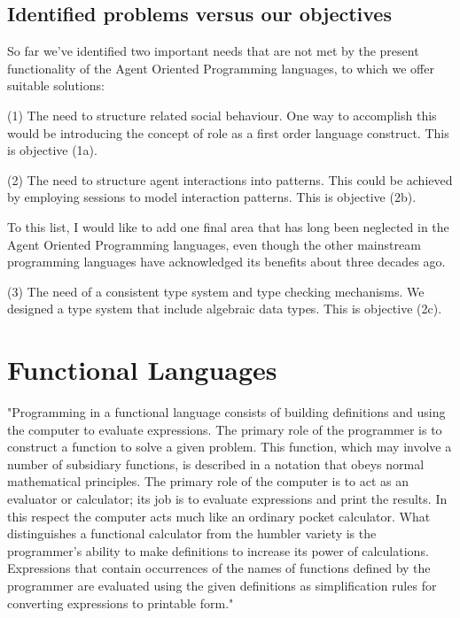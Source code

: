 \documentclass[a4paper,12pt,oneside,fleqn]{book} %
\begin{document}
\section{Identified problems versus our objectives} %
So far we've identified two important needs that are not met by the
present functionality of the Agent Oriented Programming languages, to which
we offer suitable solutions:

(1) The need to structure related social behaviour. One way to accomplish
this would be introducing the concept of role as a first order language
construct. This is objective (1a).

(2) The need to structure agent interactions into patterns. This could be
achieved by employing sessions to model interaction patterns. This is
objective (2b).

To this list, I would like to add one final area that has long been
neglected in the Agent Oriented Programming languages, even though the
other mainstream programming languages have acknowledged its benefits about
three decades ago.

(3) The need of a consistent type system and type checking mechanisms. We
designed a type system that include algebraic data types. This is objective
(2c).


\chapter{Functional Languages}\label{ch:flang} %

"Programming in a functional language consists of building definitions and
using the computer to evaluate expressions. The primary role of the
programmer is to construct a function to solve a given problem. This
function, which may involve a number of subsidiary functions, is described
in a notation that obeys normal mathematical principles. The primary role
of the computer is to act as an evaluator or calculator; its job is to
evaluate expressions and print the results. In this respect the computer
acts much like an ordinary pocket calculator. What distinguishes a
functional calculator from the humbler variety is the programmer's ability
to make definitions to increase its power of calculations. Expressions that
contain occurrences of the names of functions defined by the programmer are
evaluated using the given definitions as simplification rules for converting
expressions to printable form."~\cite{bird1988introduction}
\end{document}
